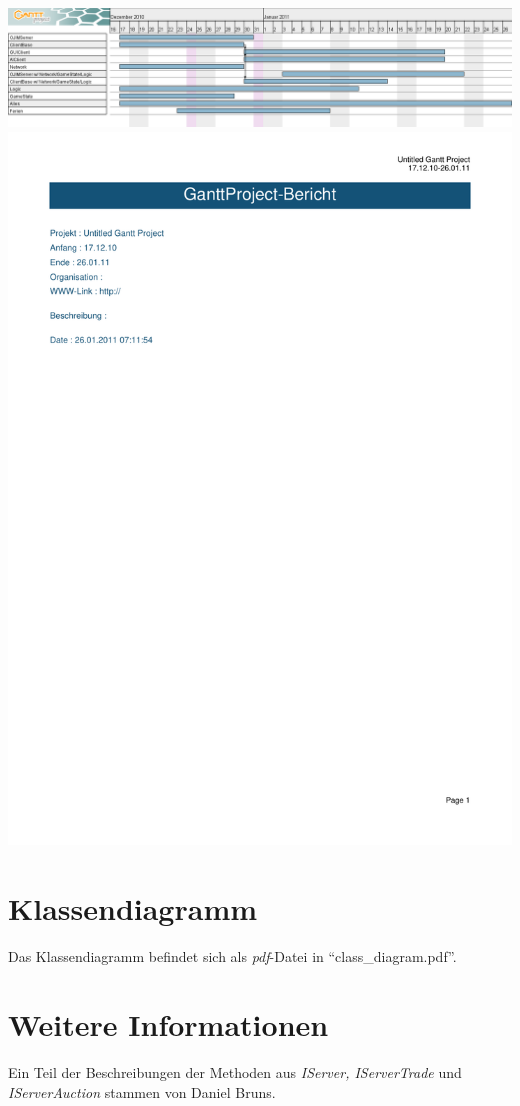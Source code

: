 \documentclass[a4paper,10pt]{article}
\begin{document}
\includegraphics[width=17cm]{Gantt/gantt2}
\includegraphics[width=17cm]{Gantt/gantt}
\section{Klassendiagramm}
Das Klassendiagramm befindet sich als \textit{pdf}-Datei in "`class\_diagram.pdf"'.
\section{Weitere Informationen}
Ein Teil der Beschreibungen der Methoden aus \textit{IServer, IServerTrade} und \textit{IServerAuction} stammen von Daniel Bruns.
\end{document}
